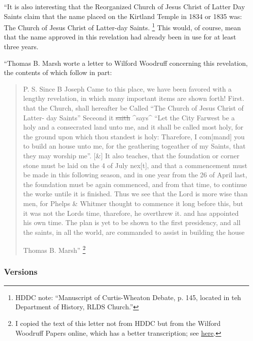 			``It is also interesting that the Reorganized Church of Jesus Christ of Latter Day Saints claim that the name placed on the Kirtland Temple in 1834 or 1835 was: The Church of Jesus Christ of Latter-day Saints.%
				\footnote{%
					HDDC note: ``Manuscript of Curtis-Wheaton Debate, p. 145, located in teh Department of History, RLDS Church.''
					}
			This would, of course, mean that the name approved in this revelation had already been in use for at least three years.
			
			``Thomas B. Marsh worte a letter to Wilford Woodruff concerning this revelation, the contents of which follow in part:
			
				\begin{quote}
					P. S. Since B Joseph Came to this place, we have been favored with a lengthy
					revelation, in which many important items are shown forth! First. that the Church, shall hereafter be Called ``The Church of Jesus Christ of Latter- day Saints'' Seceond it \sout{saith} \^{}says\^{} ``Let the City Farwest be a holy and a
					consecrated land unto me, and it shall be called most holy, for the ground upon which thou standest is holy: Tharefore, I com[mand] you to build an house unto me, for the geathering togeather of my Saints, that they may worship me''. [\&]
					It also teaches, that the foundation or corner stone must be laid on the 4
					of July nex[t], and that a commencement must be made in this following season, and in one year from the 26 of April last, the foundation must be
					again commenced, and from that time, to continue the worke untile it is finished. Thus we see that the Lord is more wise than men, for Phelps \& Whitmer thought to commence it long before this, but it was
					not the Lords time, tharefore, he overthrew it. and has appointed his own time. The plan is yet to be shown to the first presidency, and all the saints, in all the world, are commanded to assist in building the house
					
					Thomas B. Marsh''%
						\footnote{%
							I copied the text of this letter not from HDDC but from the Wilford Woodruff Papers online, which has a better transcription; see \href{https://wilfordwoodruffpapers.org/documents/f8bf0fbd-8e92-4209-9323-17f826d596e8/page/8b604c4d-a172-4758-9533-a88edf0e8c09}{here}.
							}
				\end{quote}
					
	\subsubsection{Versions}
		\label{DC115-V}
		
